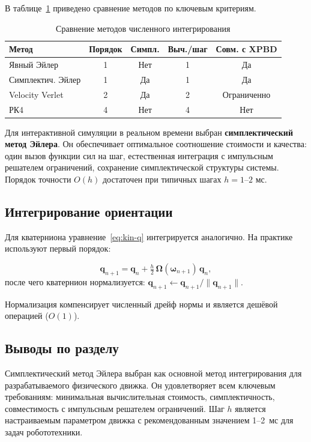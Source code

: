 В таблице~\ref{tab:integrators} приведено сравнение методов по ключевым критериям.

\begin{table}[H]
  \centering
  \caption{Сравнение методов численного интегрирования}
  \label{tab:integrators}
  \begin{tabular}{lcccc}
    \toprule
    Метод & Порядок & Симпл. & Выч./шаг & Совм. с XPBD \\
    \midrule
    Явный Эйлер      & 1 & Нет & 1 & Да \\
    Симплектич. Эйлер & 1 & Да  & 1 & Да \\
    Velocity Verlet   & 2 & Да  & 2 & Ограниченно \\
    РК4              & 4 & Нет & 4 & Нет \\
    \bottomrule
  \end{tabular}
\end{table}

Для интерактивной симуляции в реальном времени выбран \textbf{симплектический метод Эйлера}. Он обеспечивает 
оптимальное соотношение стоимости и качества: один вызов функции сил на шаг, естественная интеграция с 
импульсным решателем ограничений, сохранение симплектической структуры системы. Порядок точности $O(h)$ 
достаточен при типичных шагах $h = 1\text{–}2\text{ мс}$.

\subsection{Интегрирование ориентации}

Для кватерниона уравнение~\eqref{eq:kin-q} интегрируется аналогично. На практике используют первый порядок:

\begin{equation}
  \mathbf{q}_{n+1} = \mathbf{q}_n + \tfrac{h}{2}\,\boldsymbol{\Omega}(\boldsymbol{\omega}_{n+1})\,\mathbf{q}_n,
  \label{eq:quat-integrate}
\end{equation}
после чего кватернион нормализуется: $\mathbf{q}_{n+1} \leftarrow \mathbf{q}_{n+1} / \|\mathbf{q}_{n+1}\|$.

Нормализация компенсирует численный дрейф нормы и является дешёвой операцией ($O(1)$).

\subsection{Выводы по разделу}

Симплектический метод Эйлера выбран как основной метод интегрирования для разрабатываемого физического движка. 
Он удовлетворяет всем ключевым требованиям: минимальная вычислительная стоимость, симплектичность, 
совместимость с импульсным решателем ограничений. Шаг $h$ является настраиваемым параметром движка с 
рекомендованным значением 1–2~мс для задач робототехники.

